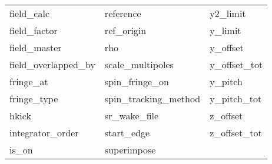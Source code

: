\begin{tabular}{lll}
field_calc                  & reference                   & y2_limit                    \\
field_factor                & ref_origin                  & y_limit                     \\
field_master                & rho                         & y_offset                    \\
field_overlapped_by         & scale_multipoles            & y_offset_tot                \\
fringe_at                   & spin_fringe_on              & y_pitch                     \\
fringe_type                 & spin_tracking_method        & y_pitch_tot                 \\
hkick                       & sr_wake_file                & z_offset                    \\
integrator_order            & start_edge                  & z_offset_tot                \\
is_on                       & superimpose                 &                             \\
 \bottomrule
 \end{tabular}
 \vfill
 
